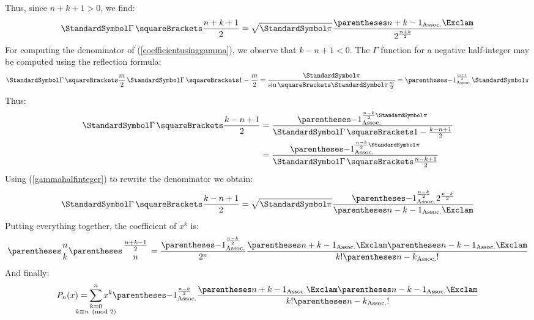\documentclass[10pt, a4paper, oneside]{basestyle}
\begin{document}
Thus, since $n + k + 1 > 0$, we find:
\begin{equation*}
\Gamma\of{\frac{n + k + 1}{2}} =
  \sqrt{\Pi}
  \frac{\DoubleFactorial{\pa{n + k - 1}}}{2^{\frac{n + k}{2}}}
\end{equation*}
For computing the denominator of (\ref{coefficientusinggamma}), we observe that $k - n + 1 < 0$.  The $\Gamma$ function for a negative half-integer may be computed using the reflection formula:
\begin{equation*}
\Gamma\of{\frac{m}{2}}\Gamma\of{1 - \frac{m}{2}} = \frac{\Pi}{\sin\of{\Pi\frac{m}{2}}} = \pa{-1}^{\frac{m + 1}{2}} \Pi
\end{equation*}
Thus:
\begin{align*}
\Gamma\of{\frac{k - n + 1}{2}} &= \frac{\pa{-1}^{\frac{n - k}{2} \Pi}}{\Gamma\of{1 - \frac{k - n + 1}{2}}}\\
&= \frac{\pa{-1}^{\frac{n - k}{2} \Pi}}{\Gamma\of{\frac{n - k + 1}{2}}}
\end{align*}
Using (\ref{gammahalfinteger}) to rewrite the denominator we obtain:
\begin{equation*}
\Gamma\of{\frac{k - n + 1}{2}} =
  \sqrt{\Pi}
  \frac
    {\pa{-1}^{\frac{n - k}{2}}{2^{\frac{n - k}{2}}}}
    {\DoubleFactorial{\pa{n - k - 1}}}
\end{equation*}
Putting everything together, the coefficient of $x^k$ is:
\begin{equation*}
\binom{n}{k} \binom{\frac{n + k - 1}{2}}{n} =
  \frac
    {\pa{-1}^{\frac{n - k}{2}}}
    {2^n}
  \frac
    {\DoubleFactorial{\pa{n + k - 1}}\DoubleFactorial{\pa{n - k - 1}}}
    {\Factorial{k}\Factorial{\pa{n - k}}}
\end{equation*}
And finally:
\begin{equation*}
P_n(x) = \sum{\substack{k = 0\\ k \equiv n \pmod 2}}[n]
  x^k \pa{-1}^{\frac{n - k}{2}}
  \frac
    {\DoubleFactorial{\pa{n + k - 1}}\DoubleFactorial{\pa{n - k - 1}}}
    {\Factorial{k}\Factorial{\pa{n - k}}}
\end{equation*}
\end{document}
